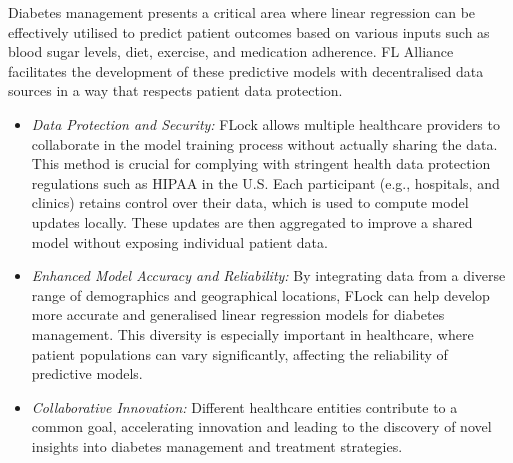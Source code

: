 \documentclass[conference]{IEEEtran}
\newcommand{\FL}{\ac{FL} Alliance\xspace}
\begin{document}
Diabetes management presents a critical area where linear regression can be effectively utilised to predict patient outcomes based on various inputs such as blood sugar levels, diet, exercise, and medication adherence. \FL facilitates the development of these predictive models with decentralised data sources in a way that respects patient data protection.


\begin{itemize}
    \item \emph{Data Protection and Security:} FLock allows multiple healthcare providers to collaborate in the model training process without actually sharing the data. This method is crucial for complying with stringent health data protection regulations such as HIPAA in the U.S. Each participant (e.g., hospitals, and clinics) retains control over their data, which is used to compute model updates locally. These updates are then aggregated to improve a shared model without exposing individual patient data.

\item \emph{Enhanced Model Accuracy and Reliability:} By integrating data from a diverse range of demographics and geographical locations, FLock can help develop more accurate and generalised linear regression models for diabetes management. This diversity is especially important in healthcare, where patient populations can vary significantly, affecting the reliability of predictive models.

\item \emph{Collaborative Innovation:} Different healthcare entities contribute to a common goal, accelerating innovation and leading to the discovery of novel insights into diabetes management and treatment strategies.
\end{itemize}




\end{document}
